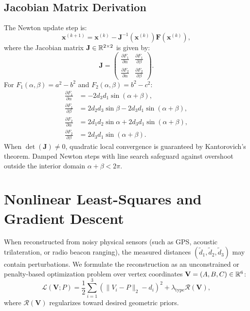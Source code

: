 \subsection{Jacobian Matrix Derivation}
The Newton update step is:
\begin{equation}
\mathbf{x}^{(k+1)} = \mathbf{x}^{(k)} - \mathbf{J}^{-1}(\mathbf{x}^{(k)}) \mathbf{F}(\mathbf{x}^{(k)}),
\end{equation}
where the Jacobian matrix $\mathbf{J} \in \mathbb{R}^{2 \times 2}$ is given by:
\begin{equation}
\mathbf{J} = \begin{pmatrix}
\frac{\partial F_1}{\partial \alpha} & \frac{\partial F_1}{\partial \beta} \\
\frac{\partial F_2}{\partial \alpha} & \frac{\partial F_2}{\partial \beta}
\end{pmatrix}.
\end{equation}
For $F_1(\alpha, \beta) = a^2 - b^2$ and $F_2(\alpha, \beta) = b^2 - c^2$:
\begin{align}
\frac{\partial F_1}{\partial \alpha} &= -2 d_3 d_1 \sin(\alpha + \beta), \\
\frac{\partial F_1}{\partial \beta} &= 2 d_2 d_3 \sin \beta - 2 d_3 d_1 \sin(\alpha + \beta), \\
\frac{\partial F_2}{\partial \alpha} &= 2 d_1 d_2 \sin \alpha + 2 d_3 d_1 \sin(\alpha + \beta), \\
\frac{\partial F_2}{\partial \beta} &= 2 d_3 d_1 \sin(\alpha + \beta).
\end{align}
When $\det(\mathbf{J}) \neq 0$, quadratic local convergence is guaranteed by Kantorovich's theorem. Damped Newton steps with line search safeguard against overshoot outside the interior domain $\alpha + \beta < 2\pi$.

\section{Nonlinear Least-Squares and Gradient Descent}
When reconstructed from noisy physical sensors (such as GPS, acoustic trilateration, or radio beacon ranging), the measured distances $(\tilde{d}_1, \tilde{d}_2, \tilde{d}_3)$ may contain perturbations. We formulate the reconstruction as an unconstrained or penalty-based optimization problem over vertex coordinates $\mathbf{V} = (A, B, C) \in \mathbb{R}^6$:
\begin{equation}
\mathcal{L}(\mathbf{V}; P) = \frac{1}{2} \sum_{i=1}^3 \left( \|V_i - P\|_2 - d_i \right)^2 + \lambda_{\text{type}} \mathcal{R}(\mathbf{V}),
\end{equation}
where $\mathcal{R}(\mathbf{V})$ regularizes toward desired geometric priors.

